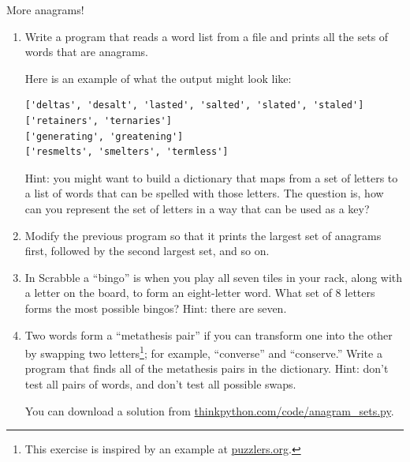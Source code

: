 \documentclass[10pt]{book}
\begin{document}
\begin{ex}
\label{anagrams}


More anagrams!

\begin{enumerate}

\item Write a program
that reads a word list from a file and
prints all the sets of words that are anagrams.

Here is an example of what the output might look like:

\beforeverb
\begin{verbatim}
['deltas', 'desalt', 'lasted', 'salted', 'slated', 'staled']
['retainers', 'ternaries']
['generating', 'greatening']
['resmelts', 'smelters', 'termless']
\end{verbatim}
\afterverb
%
Hint: you might want to build a dictionary that maps from a
set of letters to a list of words that can be spelled with those
letters.  The question is, how can you represent the set of
letters in a way that can be used as a key?

\item Modify the previous program so that it prints the largest set
of anagrams first, followed by the second largest set, and so on.


\item In Scrabble a ``bingo'' is when you play all seven tiles in
your rack, along with a letter on the board, to form an eight-letter
word.  What set of 8 letters forms the most possible bingos?
Hint: there are seven.



\item Two words form a ``metathesis pair'' if you can transform one
  into the other by swapping two letters\footnote{This exercise is
    inspired by an example at \url{puzzlers.org}.}; for example,
  ``converse'' and ``conserve.''  Write a program that finds all of
  the metathesis pairs in the dictionary.  Hint: don't test all pairs
  of words, and don't test all possible swaps.

You can download a solution from \url{thinkpython.com/code/anagram_sets.py}.

\end{enumerate}
\end{ex}
\end{document}
